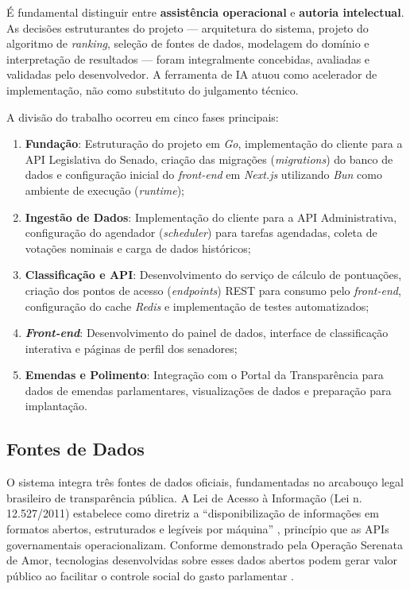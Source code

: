É fundamental distinguir entre \textbf{assistência operacional} e \textbf{autoria intelectual}. As decisões estruturantes do projeto --- arquitetura do sistema, projeto do algoritmo de \textit{ranking}, seleção de fontes de dados, modelagem do domínio e interpretação de resultados --- foram integralmente concebidas, avaliadas e validadas pelo desenvolvedor. A ferramenta de IA atuou como acelerador de implementação, não como substituto do julgamento técnico.

A divisão do trabalho ocorreu em cinco fases principais:
\begin{enumerate}
    \item \textbf{Fundação}: Estruturação do projeto em \textit{Go}, implementação do cliente para a API Legislativa do Senado, criação das migrações (\textit{migrations}) do banco de dados e configuração inicial do \textit{front-end} em \textit{Next.js} utilizando \textit{Bun} como ambiente de execução (\textit{runtime});
    \item \textbf{Ingestão de Dados}: Implementação do cliente para a API Administrativa, configuração do agendador (\textit{scheduler}) para tarefas agendadas, coleta de votações nominais e carga de dados históricos;
    \item \textbf{Classificação e API}: Desenvolvimento do serviço de cálculo de pontuações, criação dos pontos de acesso (\textit{endpoints}) REST para consumo pelo \textit{front-end}, configuração do cache \textit{Redis} e implementação de testes automatizados;
    \item \textbf{\textit{Front-end}}: Desenvolvimento do painel de dados, interface de classificação interativa e páginas de perfil dos senadores;
    \item \textbf{Emendas e Polimento}: Integração com o Portal da Transparência para dados de emendas parlamentares, visualizações de dados e preparação para implantação.
\end{enumerate}

\subsection{Fontes de Dados}

O sistema integra três fontes de dados oficiais, fundamentadas no arcabouço legal brasileiro de transparência pública. A Lei de Acesso à Informação (Lei n. 12.527/2011) estabelece como diretriz a ``disponibilização de informações em formatos abertos, estruturados e legíveis por máquina'' \cite{lai2011}, princípio que as APIs governamentais operacionalizam. Conforme demonstrado pela Operação Serenata de Amor, tecnologias desenvolvidas sobre esses dados abertos podem gerar valor público ao facilitar o controle social do gasto parlamentar \cite{albuquerque2018serenata}.

